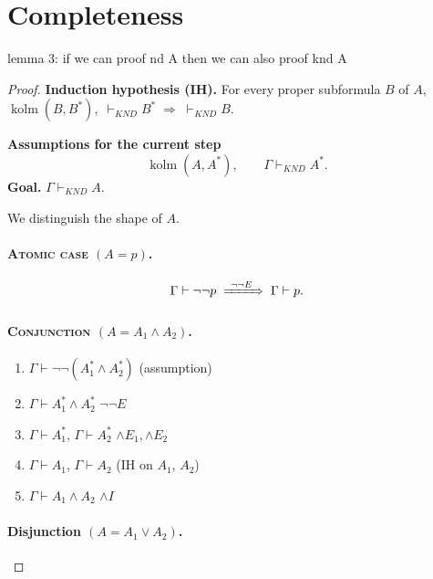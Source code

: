 \documentclass{article}
\begin{document}
\section{Completeness}
lemma 3: if we can proof nd A then we can also proof knd A
\begin{proof}[Proof]
  \leavevmode\par
  \textbf{Induction hypothesis (IH).}\;
  For every proper subformula $B$ of $A$,
  \(
    \operatorname{kolm}(B,B^{*}),\;
    \vdash_{\textit{KND}} B^{*}
    \;\Rightarrow\;
    \vdash_{\textit{KND}} B .
  \)
  
  \medskip
  \textbf{Assumptions for the current step}
  \[
    \operatorname{kolm}(A,A^{*}),\qquad
    \Gamma\vdash_{\textit{KND}} A^{*}.
  \]
  \textbf{Goal.}\; $\Gamma\vdash_{\textit{KND}} A$.
  
  \bigskip
  \noindent
  We distinguish the shape of $A$.
  
  \paragraph{\textsc{Atomic case} \boldmath$(A=p)$.}
  \[
    \Gamma\vdash \neg\neg p
    \;\xRightarrow{\ \neg\neg E\ }\;
    \Gamma\vdash p.
  \]
  
  \paragraph{\textsc{Conjunction} \boldmath$(A=A_1\land A_2)$.}
  
  \begin{enumerate}[leftmargin=1.5em,labelsep=.5em,label={\textbf{Step~\arabic*:}}]
    \item $\Gamma\vdash \neg\neg(A_1^{*}\land A_2^{*})$
          \hfill(assumption)
    \item $\Gamma\vdash A_1^{*}\land A_2^{*}$
          \hfill$\neg\neg E$
    \item $\Gamma\vdash A_1^{*}$, \;$\Gamma\vdash A_2^{*}$
          \hfill$\land E_1,\land E_2$
    \item $\Gamma\vdash A_1$, \;$\Gamma\vdash A_2$
          \hfill(IH on $A_1$, $A_2$)
    \item $\Gamma\vdash A_1\land A_2$
          \hfill$\land I$
  \end{enumerate}
  
  \paragraph{Disjunction \boldmath$(A = A_{1}\lor A_{2})$.}


\end{proof}
\end{document}
